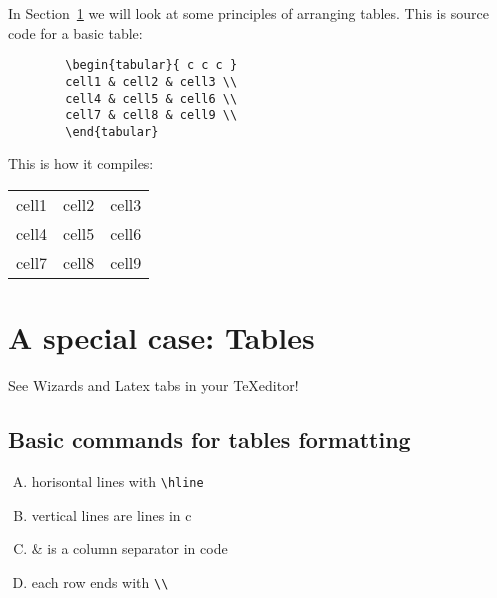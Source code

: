 \documentclass[a4paper,11pt]{article}
\begin{document}
\begin{multicols}{3} %
	\clearpage\maketitle
	\thispagestyle{empty}
	
	In Section~\ref{sec:tabs} we will look at some principles of arranging tables.
	\usetikzlibrary{calc, positioning, shapes.arrows}
	\columnbreak 
	This is source code for a basic table:
	\begin{verbatim}
		\begin{tabular}{ c c c } 
		cell1 & cell2 & cell3 \\ 
		cell4 & cell5 & cell6 \\ 
		cell7 & cell8 & cell9 \\ 
		\end{tabular}
	\end{verbatim}

	
	\columnbreak
	This is how it compiles:
	\begin{tabular}{ c c c } 
		cell1 & cell2 & cell3 \\ \usetikzlibrary{calc, positioning, shapes.arrows}
		cell4 & cell5 & cell6 \\ 
		cell7 & cell8 & cell9 \\ 
	\end{tabular}
	\setlength\fboxsep{3pt} %
	\setlength\fboxrule{1pt} %
\end{multicols}

\section{A special case: Tables}\label{sec:tabs}

See Wizards and Latex tabs in your \TeX editor!

\subsection{Basic commands for tables formatting}
\begin{enumerate}[A)]
	\item horisontal lines with \verb|\hline|
	\item vertical lines are lines in c%
	\item \& is a column separator in code
	\item each row ends with \verb|\\|
\end{enumerate}
\end{document}
